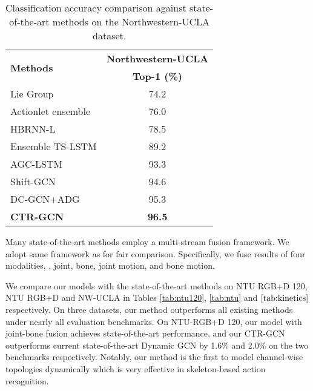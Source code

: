 \documentclass[10pt,twocolumn,letterpaper]{article}
\begin{document}
\begin{table}
	\begin{center}
		\begin{tabular}{l c}
			\hline
			\multirow{2}{*}{\textbf{Methods}} & \textbf{Northwestern-UCLA} \\  &\textbf{Top-1 (\%)}\\
			\hline\hline
			Lie Group\cite{veeriah2015differential}  & 74.2\\
			Actionlet ensemble\cite{wang2013learning} & 76.0\\
			HBRNN-L\cite{du2015hierarchical} & 78.5\\
			Ensemble TS-LSTM\cite{lee2017ensemble} & 89.2\\
			\hline
			AGC-LSTM\cite{si2019attention} & 93.3\\
			Shift-GCN\cite{cheng2020skeleton} & 94.6\\
			DC-GCN+ADG\cite{cheng2020eccv} & 95.3 \\
			\hline\hline
			\textbf{CTR-GCN} & \textbf{96.5}\\
			\hline
		\end{tabular}
	\end{center}
	\vspace{-0.2cm}
	\caption{Classification accuracy comparison against state-of-the-art methods on the Northwestern-UCLA dataset.}
	\label{tab:kinetics}
	\vspace{-0.5cm}
\end{table}

Many state-of-the-art methods employ a multi-stream fusion framework. We adopt same framework as \cite{cheng2020skeleton,ye2020dynamic} for fair comparison. Specifically, we fuse results of four modalities, \ie, joint, bone, joint motion, and bone motion.

We compare our models with the state-of-the-art methods on NTU RGB+D 120, NTU RGB+D and NW-UCLA in Tables \ref{tab:ntu120}, \ref{tab:ntu} and $\ref{tab:kinetics}$ respectively. On three datasets, our method outperforms all existing methods under nearly all evaluation benchmarks. On NTU-RGB+D 120, our model with joint-bone fusion achieves state-of-the-art performance, and our CTR-GCN outperforms current state-of-the-art Dynamic GCN \cite{ye2020dynamic} by 1.6\% and 2.0\% on the two benchmarks respectively. Notably, our method is the first to model channel-wise topologies dynamically which is very effective in skeleton-based action recognition.
\end{document}

